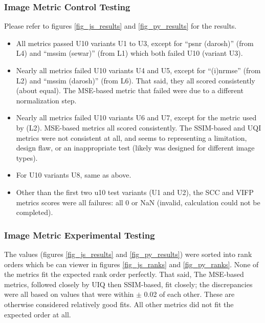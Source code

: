 \documentclass[12pt, titlepage]{article}
\begin{document}
\subsubsection{Image Metric Control Testing}
Please refer to figures \ref{fig_js_results} and \ref{fig_py_results} for the results.
\begin{itemize}
  \item All metrics passed U10 variants U1 to U3,
    except for ``psnr (darosh)'' (from L4) and ``mssim (sewar)'' (from L1)
    which both failed U10 (variant U3).
  \item Nearly all metrics failed U10 variants U4 and U5,
    except for ``(i)nrmse'' (from L2) and ``mssim (darosh)'' (from L6).
    That said, they all scored consistently (about equal).
    The MSE-based metric that failed were due to a different
    normalization step.
  \item Nearly all metrics failed U10 variants U6 and U7,
    except for the metric used by \progname{} (L2).
    MSE-based metrics all scored consistently. The SSIM-based and UQI
    metrics were not consistent at all, and seems to representing
    a limitation, design flaw, or an inappropriate test
    (likely was designed for different image types).
  \item For U10 variants U8, same as above.
  \item Other than the first two u10 test variants (U1 and U2),
    the SCC and VIFP metrics scores were all failures:
    all 0 or NaN (invalid, calculation could not be completed).
\end{itemize}


\subsubsection{Image Metric Experimental Testing}
The values (figures \ref{fig_js_results} and \ref{fig_py_results}) were sorted into
rank orders which be can viewer in figures \ref{fig_js_ranks} and \ref{fig_py_ranks}.
None of the metrics fit the expected rank order perfectly. That said,
The MSE-based metrics, followed closely by UIQ then SSIM-based, fit closely; the discrepancies
were all based on values that were within $\pm$ 0.02 of each other. These are otherwise considered
relatively good fits. All other metrics did not fit the expected order at all.
\end{document}
